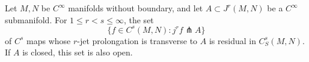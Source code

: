 Let $M, N$ be $C^\infty$ manifolds without boundary, and let $A \subset J^r(M,N)$ be a $C^\infty$ submanifold. For $1 \leqslant r < s \leqslant \infty$, the set
$$\{ f \in C^s(M,N) : j^r f \pitchfork A \}$$
of $C^s$ maps whose $r$-jet prolongation is transverse to $A$ is residual in $C^s_S(M,N)$. If $A$ is closed, this set is also open.
